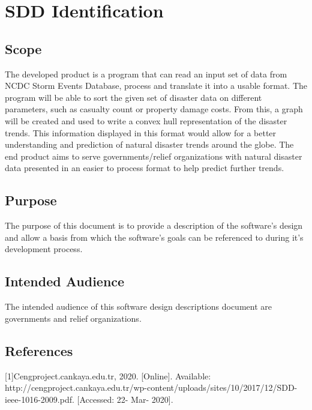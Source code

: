 \documentclass[12pt]{article}
\begin{document}
\newpage
\normalsize
\tableofcontents
\newpage

    
\section{SDD Identification}
    \subsection{Scope}
        The developed product is a program that can read an input set of data from NCDC Storm Events Database, process and translate it into a usable format. The program will be able to sort the given set of disaster data on different parameters, such as casualty count or property damage costs. From this, a graph will be created and used to write a convex hull representation
        of the disaster trends. This information displayed in this format would allow for a better understanding and prediction of natural disaster trends around the globe. The end product aims to serve governments/relief organizations with natural disaster data presented in an easier to process format to help predict further trends.
    \subsection{Purpose}
        The purpose of this document is to provide a description of the software's design and allow a basis from which the software's goals can be referenced to during it's development process. 
    \subsection{Intended Audience}
        The intended audience of this software design descriptions document are governments and relief organizations.
    \subsection{References}
[1]Cengproject.cankaya.edu.tr, 2020. [Online]. Available: http://cengproject.cankaya.edu.tr/wp-content/uploads/sites/10/2017/12/SDD-ieee-1016-2009.pdf. [Accessed: 22- Mar- 2020].
\end{document}
